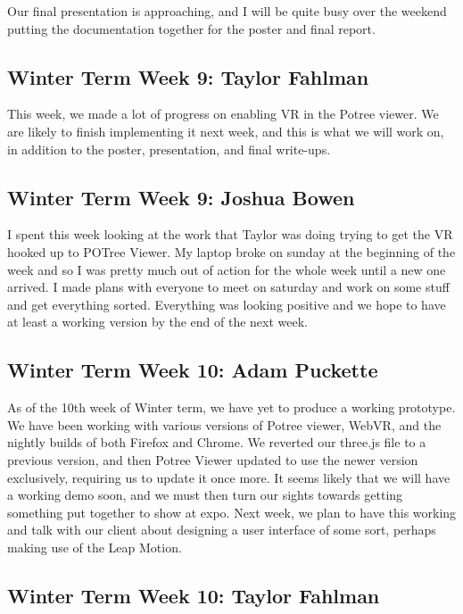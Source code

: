\documentclass[draftclsnofoot,onecolumn]{IEEEtran}
\begin{document}
Our final presentation is approaching, and I will be quite busy over the weekend putting the documentation together for the poster and final report.

\subsection{Winter Term Week 9: Taylor Fahlman}

This week, we made a lot of progress on enabling VR in the Potree viewer. We are likely to finish implementing it next week, and this is what we will work on, in addition to the poster, presentation, and final write-ups.

\subsection{Winter Term Week 9: Joshua Bowen}

I spent this week looking at the work that Taylor was doing trying to get the VR hooked up to POTree Viewer. My laptop broke on sunday at the beginning of the week and so I was pretty much out of action for the whole week until a new one arrived. I made plans with everyone to meet on saturday and work on some stuff and get everything sorted. Everything was looking positive and we hope to have at least a working version by the end of the next week.

\subsection{Winter Term Week 10: Adam Puckette}

As of the 10th week of Winter term, we have yet to produce a working prototype. We have been working with various versions of Potree viewer, WebVR, and the nightly builds of both Firefox and Chrome. We reverted our three.js file to a previous version, and then Potree Viewer updated to use the newer version exclusively, requiring us to update it once more. It seems likely that we will have a working demo soon, and we must then turn our sights towards getting something put together to show at expo. Next week, we plan to have this working and talk with our client about designing a user interface of some sort, perhaps making use of the Leap Motion.

\subsection{Winter Term Week 10: Taylor Fahlman}
\end{document}
